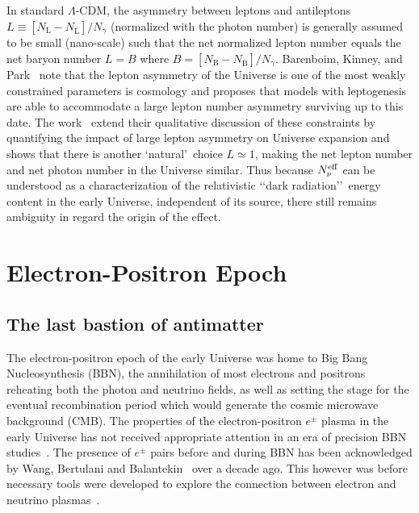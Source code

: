 \documentclass[universe,article,submit,moreauthors,pdftex,a4paper]{Definitions/mdpi}
\begin{document}
In standard $\Lambda$-CDM, the asymmetry between leptons and antileptons $L\equiv [N_\mathrm{L}-N_{\overline{\mathrm{L}}}] /N_\gamma $ (normalized with the photon number) is generally assumed to be small (nano-scale) such that the net normalized lepton number equals the net baryon number $L=B$ where $B=[N_\mathrm{B}-N_{\overline{\mathrm{B}}}]/N_\gamma $. Barenboim, Kinney, and Park~\cite{Barenboim:2016shh,Barenboim:2017dfq} note that the lepton asymmetry of the Universe is one of the most weakly constrained parameters is cosmology and proposes that models with leptogenesis are able to accommodate a large lepton number asymmetry surviving up to this date. The work~\cite{Yang:2018oqg} extend their qualitative discussion of these constraints by quantifying the impact of large lepton asymmetry on Universe expansion and shows that there is another \lq natural\rq\ choice $L\simeq 1$, making the net lepton number and net photon number in the Universe similar. Thus because $N_{\nu}^{{\rm eff}}$ can be understood as a characterization of the relativistic \lq\lq dark radiation\rq\rq\ energy content in the early Universe, independent of its source, there still remains ambiguity in regard the origin of the effect.

\section{Electron-Positron Epoch}\label{sec:ElectronPositron}
\subsection{The last bastion of antimatter}\label{sec:ElectronPositronDensity}
\noindent The electron-positron epoch of the early Universe was home to Big Bang Nucleosynthesis (BBN), the annihilation of most electrons and positrons reheating both the photon and neutrino fields, as well as setting the stage for the eventual recombination period which would generate the cosmic microwave background (CMB). The properties of the electron-positron $e^{\pm}$ plasma in the early Universe has not received appropriate attention in an era of precision BBN studies~\cite{Pitrou:2018cgg}. The presence of $e^{\pm}$ pairs before and during BBN has been acknowledged by Wang, Bertulani and Balantekin~\cite{Wang:2010px,Hwang:2021kno} over a decade ago. This however was before necessary tools were developed to explore the connection between electron and neutrino plasmas~\cite{Mangano:2005cc,Birrell:2012gg,Birrell:2014uka}.
\end{document}
